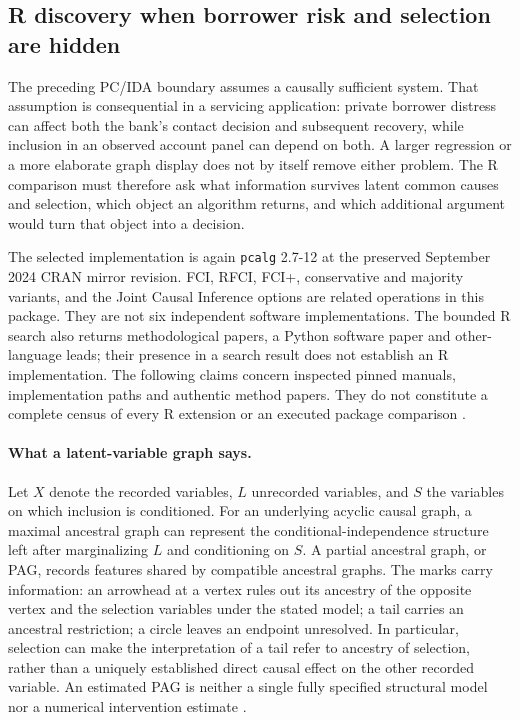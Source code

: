 \subsection{R discovery when borrower risk and selection are hidden}
\label{exec13:latent-r}

The preceding PC/IDA boundary assumes a causally sufficient system. That
assumption is consequential in a servicing application: private borrower
distress can affect both the bank's contact decision and subsequent recovery,
while inclusion in an observed account panel can depend on both. A larger
regression or a more elaborate graph display does not by itself remove either
problem. The R comparison must therefore ask what information survives latent
common causes and selection, which object an algorithm returns, and which
additional argument would turn that object into a decision.

The selected implementation is again \texttt{pcalg} 2.7-12 at the preserved
September 2024 CRAN mirror revision. FCI, RFCI, FCI+, conservative and majority
variants, and the Joint Causal Inference options are related operations in
this package. They are not six independent software implementations. The
bounded R search also returns methodological papers, a Python software paper
and other-language leads; their presence in a search result does not establish
an R implementation. The following claims concern inspected pinned manuals,
implementation paths and authentic method papers. They do not constitute a
complete census of every R extension or an executed package comparison
\citep{exec13_latentr_primary}.

\paragraph{What a latent-variable graph says.}
Let $X$ denote the recorded variables, $L$ unrecorded variables, and $S$ the
variables on which inclusion is conditioned. For an underlying acyclic causal
graph, a maximal ancestral graph can represent the conditional-independence
structure left after marginalizing $L$ and conditioning on $S$. A partial
ancestral graph, or PAG, records features shared by compatible ancestral
graphs. The marks carry information: an arrowhead at a vertex rules out its
ancestry of the opposite vertex and the selection variables under the stated
model; a tail carries an ancestral restriction; a circle leaves an endpoint
unresolved. In particular, selection can make the interpretation of a tail
refer to ancestry of selection, rather than a uniquely established direct
causal effect on the other recorded variable. An estimated PAG is neither a
single fully specified structural model nor a numerical intervention estimate
\citep{exec13_latentr_primary,exec13_latentr_colombo2012}.

